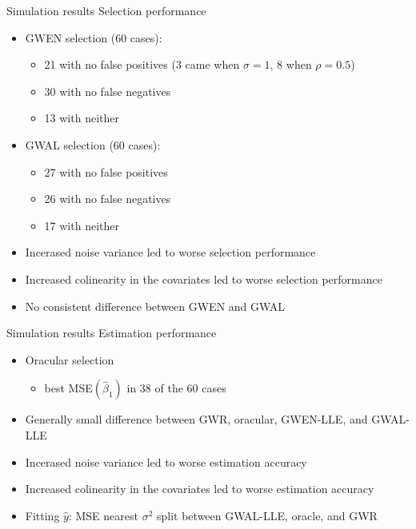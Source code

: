\documentclass[12pt,t]{beamer}
\newcommand{\subt}[1]{{\footnotesize \color{subtitle} {#1}}}
\begin{document}
\begin{frame}{Simulation results}
\subt{Selection performance}

\bigskip
\begin{itemize}
  \item GWEN selection (60 cases):
  \begin{itemize}
    \item 21 with no false positives (3 came when $\sigma = 1$, 8 when $\rho = 0.5$)
    \item 30 with no false negatives 
    \item 13 with neither
  \end{itemize}

  \item GWAL selection (60 cases):
  \begin{itemize}
    \item 27 with no false positives
    \item 26 with no false negatives
    \item 17 with neither
  \end{itemize}

  \item Incerased noise variance led to worse selection performance
  \item Increased colinearity in the covariates led to worse selection performance
  \item No consistent difference between GWEN and GWAL
\end{itemize}

\end{frame}



	
	
\begin{frame}{Simulation results}
\subt{Estimation performance}


\begin{itemize}
  \item Oracular selection
  \begin{itemize}
    \item best MSE$(\hat{\beta}_1)$ in 38 of the 60 cases
  \end{itemize}

  \item Generally small difference between GWR, oracular, GWEN-LLE, and GWAL-LLE\
  \item Incerased noise variance led to worse estimation accuracy
  \item Increased colinearity in the covariates led to worse estimation accuracy
  \item Fitting $\hat{y}$: MSE nearest $\sigma^2$ split between GWAL-LLE, oracle, and GWR
\end{itemize}
\end{frame}
	
\end{document}
